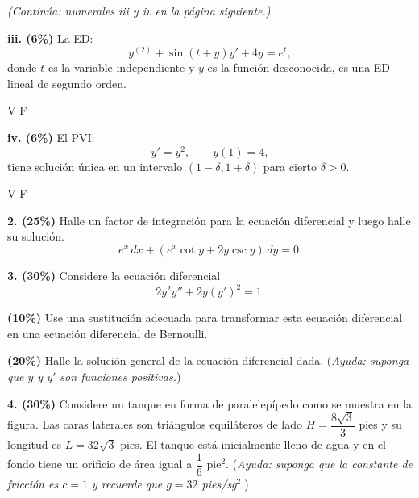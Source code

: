 \documentclass[11pt]{article}
\begin{document}
\vspace{4cm}

\hrulefill

\vspace{0.3cm}
\noindent\textit{(Continúa: numerales iii y iv en la página siguiente.)}

\newpage

\noindent\textbf{iii. (6\%)} La ED:
\[
y^{(2)}+\sin(t+y)y'+4y=e^t,
\]
donde $t$ es la variable independiente y $y$ es la función desconocida, es una ED lineal de segundo orden.
\begin{center}
V \qquad F
\end{center}

\vspace{0.3cm}
\noindent\textbf{iv. (6\%)} El PVI:
\[
y'=y^2, \qquad y(1)=4,
\]
tiene solución única en un intervalo $(1-\delta,1+\delta)$ para cierto $\delta>0$.
\begin{center}
V \qquad F
\end{center}

\vspace{1cm}
\noindent\textbf{2. (25\%)} Halle un factor de integración para la ecuación diferencial y luego halle su solución.
\[
e^x\,dx+(e^x\cot y+2y\csc y)\,dy=0.
\]

\vspace{6cm}

\newpage

\noindent\textbf{3. (30\%)} Considere la ecuación diferencial
\[
2y^2y''+2y(y')^2=1.
\]

\begin{opciones}
\item[i.] \textbf{(10\%)} Use una sustitución adecuada para transformar esta ecuación diferencial en una ecuación diferencial de Bernoulli.

\vspace{3cm}

\item[ii.] \textbf{(20\%)} Halle la solución general de la ecuación diferencial dada. (\textit{Ayuda: suponga que $y$ y $y'$ son funciones positivas.})

\vspace{6cm}
\end{opciones}

\newpage

\noindent\textbf{4. (30\%)} Considere un tanque en forma de paralelepípedo como se muestra en la figura. Las caras laterales son triángulos equiláteros de lado $H=\dfrac{8\sqrt{3}}{3}$ pies y su longitud es $L=32\sqrt{3}$ pies. El tanque está inicialmente lleno de agua y en el fondo tiene un orificio de área igual a $\dfrac{1}{6}$ pie$^2$. (\textit{Ayuda: suponga que la constante de fricción es $c=1$ y recuerde que $g=32$ pies/sg}$^2$.)
\end{document}
